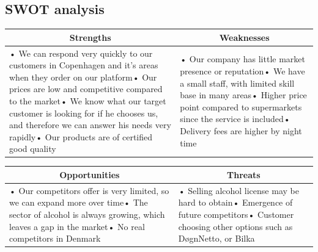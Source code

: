 \documentclass[12p]{article}
\begin{document}

\subsection{SWOT analysis} \label{SWOT}

\begin{table}[H]
  \centering
    \begin{tabular}{|p{}|p{}|}
    \hline
    \multicolumn{1}{|c|}{\textbf{Strengths}} & \multicolumn{1}{c|}{\textbf{Weaknesses}} \\
    \hline
    {• We can respond very quickly to our customers in Copenhagen and it's areas when they order on our platform\newline{}• Our prices are low and competitive compared to the market\newline{}• We know what our target customer is looking for if he chooses us, and therefore we can answer his needs very rapidly\newline{}• Our products are of certified good quality} & • Our company has little market presence or reputation\newline{}• We have a small staff, with limited skill base in many areas\newline{}• Higher price point compared to supermarkets since the service is included\newline{}• Delivery fees are higher by night time \\
    \hline
    \end{tabular}
  \label{tab:swot_one}
\end{table}

\begin{table}[H]
  \centering
    \begin{tabular}{|p{}|p{}|}
    \hline
    \multicolumn{1}{|c|}{\textbf{Opportunities}} & \multicolumn{1}{c|}{\textbf{Threats}} \\
    \hline
    {• Our competitors offer is very limited, so we can expand more over time\newline{}• The sector of alcohol is always growing, which leaves a gap in the market\newline{}• No real competitors in Denmark} & • Selling alcohol license may be hard to obtain\newline{}• Emergence of future competitors\newline{}• Customer choosing other options such as DøgnNetto, or Bilka \\
    \hline
    \end{tabular}
  \label{tab:swot_two}
\end{table}
\end{document}
